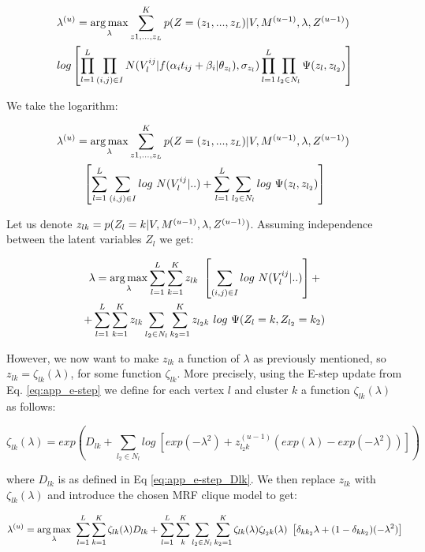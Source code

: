 \begin{multline}
\lambda^{(u)} = \operatorname*{arg\,max}_{\lambda} \sum_{z1,\dots, z_L}^K p(Z = (z_1, ..., z_L) | V, M^{(u-1)}, \lambda, Z^{(u-1)})\ \\ log \left[ \prod_{l=1}^L \prod_{(i,j) \in I} N(V_l^{ij} | f(\alpha_i t_{ij} + \beta_i | \theta_{z_l}), \sigma_{z_l}) \prod_{l = 1}^{L}\prod_{l_2 \in N_l} \Psi (z_{l}, z_{l_2}) \right]
\end{multline}


We take the logarithm:

\begin{multline}
\lambda^{(u)} = \operatorname*{arg\,max}_{\lambda} \sum_{z1,\dots, z_L}^K p(Z = (z_1, ..., z_L) | V, M^{(u-1)}, \lambda, Z^{(u-1)})\ \\ \left[ \sum_{l=1}^L \sum_{(i,j) \in I} log\ N(V_l^{ij} | ..) + \sum_{l = 1}^{L}\sum_{l_2 \in N_l} log\ \Psi (z_{l}, z_{l_2}) \right]
\end{multline}

Let us denote $z_{lk} = p(Z_l = k | V, M^{(u-1)}, \lambda, Z^{(u-1)})$. Assuming independence between the latent variables $Z_l$ we get:

\begin{multline}
\lambda = \argmax_{\lambda} \sum_{l=1}^L \sum_{k=1}^K z_{lk}\ \left[ \sum_{(i,j) \in I} log\ N(V_l^{ij} | ..) \right] + \\ + \sum_{l = 1}^{L} \sum_{k=1}^K z_{lk} \sum_{l_2 \in N_l} \sum_{k_2 = 1}^K z_{l_2k}\ log\ \Psi (Z_{l} = k, Z_{l_2} = k_2)  
\end{multline}

However, we now want to make $z_{lk}$ a function of $\lambda$ as previously mentioned, so $z_{lk}=\zeta_{lk}(\lambda)$, for some function $\zeta_{lk}$. More precisely, using the E-step update from Eq. \ref{eq:app_e-step} we define for each vertex $l$ and cluster $k$ a function $\zeta_{lk}(\lambda)$ as follows:

\begin{equation}
\zeta_{lk}(\lambda) = exp \left( D_{lk} +   \sum_{l_2 \in N_l} log\ \left[ exp(-\lambda^2) + z_{l_2k}^{(u-1)} (exp(\lambda) - exp(-\lambda^2)) \right] \right)
\end{equation}

where $D_{lk}$ is as defined in Eq \ref{eq:app_e-step_Dlk}. We then replace $z_{lk}$ with $\zeta_{lk}(\lambda)$ and introduce the chosen MRF clique model to get:

\begin{equation}
\lambda^{(u)} = \argmax_{\lambda}\ \sum_{l=1}^L \sum_{k=1}^K \zeta_{lk}(\lambda) D_{lk}  + \sum_{l = 1}^{L} \sum_{k}^K \sum_{l_2 \in N_l} \sum_{k_2 = 1}^K \zeta_{lk}(\lambda) \zeta_{l_2k}(\lambda)\ \left[ \delta_{kk_2} \lambda + (1-\delta_{kk_2}) (-\lambda^2)\right]
\end{equation}

